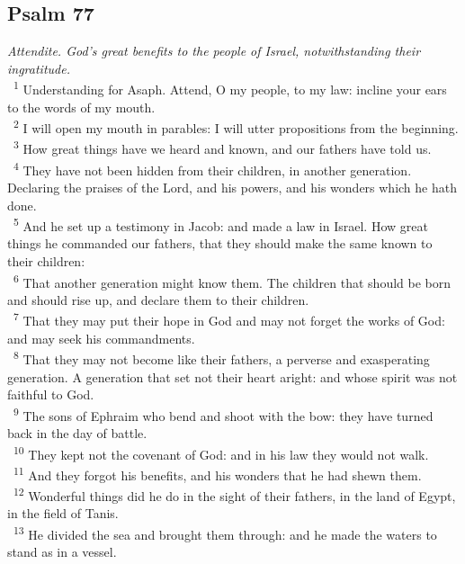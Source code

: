 \documentclass[a5paper,12pt]{article}
\begin{document}
\begin{multicols*}{2}
\section{Psalm 77}
\label{sec:org045ecbc}
\emph{Attendite. God's great benefits to the people of Israel, notwithstanding their ingratitude.}\\

~\textsuperscript{1} Understanding for Asaph. Attend, O my people, to my law: incline your ears to the words of my mouth.\\
~\textsuperscript{2} I will open my mouth in parables: I will utter propositions from the beginning.\\
~\textsuperscript{3} How great things have we heard and known, and our fathers have told us.\\
~\textsuperscript{4} They have not been hidden from their children, in another generation. Declaring the praises of the Lord, and his powers, and his wonders which he hath done.\\
~\textsuperscript{5} And he set up a testimony in Jacob: and made a law in Israel. How great things he commanded our fathers, that they should make the same known to their children:\\
~\textsuperscript{6} That another generation might know them. The children that should be born and should rise up, and declare them to their children.\\
~\textsuperscript{7} That they may put their hope in God and may not forget the works of God: and may seek his commandments.\\
~\textsuperscript{8} That they may not become like their fathers, a perverse and exasperating generation. A generation that set not their heart aright: and whose spirit was not faithful to God.\\
~\textsuperscript{9} The sons of Ephraim who bend and shoot with the bow: they have turned back in the day of battle.\\
~\textsuperscript{10} They kept not the covenant of God: and in his law they would not walk.\\
~\textsuperscript{11} And they forgot his benefits, and his wonders that he had shewn them.\\
~\textsuperscript{12} Wonderful things did he do in the sight of their fathers, in the land of Egypt, in the field of Tanis.\\
~\textsuperscript{13} He divided the sea and brought them through: and he made the waters to stand as in a vessel.\\

\end{multicols*}
\end{document}
